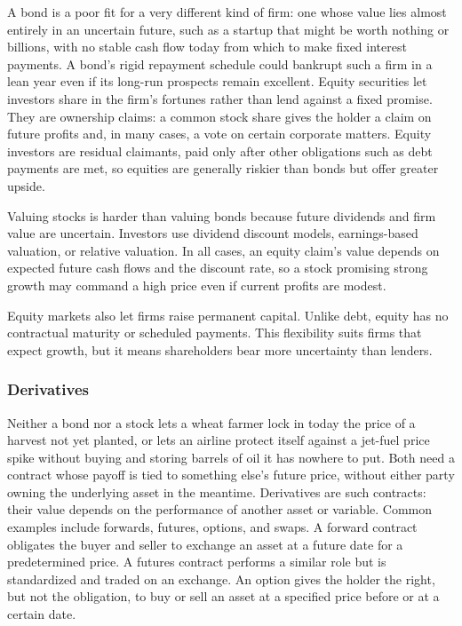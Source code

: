 \documentclass[../ai_in_finance]{subfiles}
\begin{document}
A bond is a poor fit for a very different kind of firm: one whose value lies almost entirely in an uncertain future, such as a startup that might be worth nothing or billions, with no stable cash flow today from which to make fixed interest payments. A bond's rigid repayment schedule could bankrupt such a firm in a lean year even if its long-run prospects remain excellent.
Equity securities let investors share in the firm's fortunes rather than lend against a fixed promise. They are ownership claims: a common stock share gives the holder a claim on future profits and, in many cases, a vote on certain corporate matters. Equity investors are residual claimants, paid only after other obligations such as debt payments are met, so equities are generally riskier than bonds but offer greater upside.

Valuing stocks is harder than valuing bonds because future dividends and firm value are uncertain. Investors use dividend discount models, earnings-based valuation, or relative valuation. In all cases, an equity claim's value depends on expected future cash flows and the discount rate, so a stock promising strong growth may command a high price even if current profits are modest.

Equity markets also let firms raise permanent capital. Unlike debt, equity has no contractual maturity or scheduled payments. This flexibility suits firms that expect growth, but it means shareholders bear more uncertainty than lenders.

\subsubsection*{Derivatives}

Neither a bond nor a stock lets a wheat farmer lock in today the price of a harvest not yet planted, or lets an airline protect itself against a jet-fuel price spike without buying and storing barrels of oil it has nowhere to put. Both need a contract whose payoff is tied to something else's future price, without either party owning the underlying asset in the meantime.
Derivatives are such contracts: their value depends on the performance of another asset or variable. Common examples include forwards, futures, options, and swaps. A forward contract obligates the buyer and seller to exchange an asset at a future date for a predetermined price. A futures contract performs a similar role but is standardized and traded on an exchange. An option gives the holder the right, but not the obligation, to buy or sell an asset at a specified price before or at a certain date.
\end{document}
